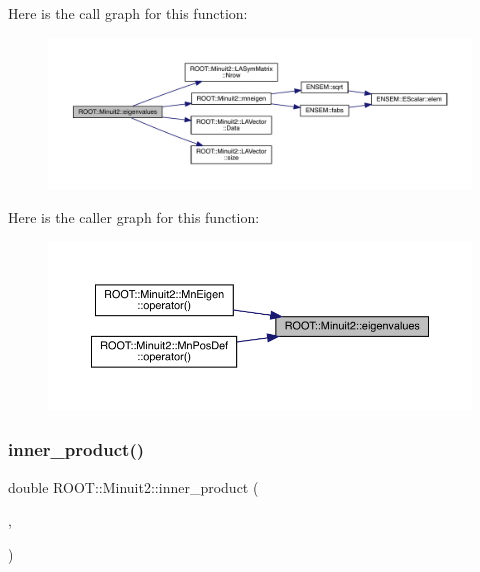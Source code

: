 Here is the call graph for this function\+:
\nopagebreak
\begin{figure}[H]
\begin{center}
\leavevmode
\includegraphics[width=350pt]{d6/d3a/namespaceROOT_1_1Minuit2_a1569bf99d4c46944433c0b5bb02b3ad6_cgraph}
\end{center}
\end{figure}
Here is the caller graph for this function\+:\nopagebreak
\begin{figure}[H]
\begin{center}
\leavevmode
\includegraphics[width=350pt]{d6/d3a/namespaceROOT_1_1Minuit2_a1569bf99d4c46944433c0b5bb02b3ad6_icgraph}
\end{center}
\end{figure}
\mbox{\label{namespaceROOT_1_1Minuit2_ac47f2faa5fce723ec08365b174b5035d}} 
\subsubsection{\texorpdfstring{inner\_product()}{inner\_product()}}
{\footnotesize\ttfamily double R\+O\+O\+T\+::\+Minuit2\+::inner\+\_\+product (\begin{DoxyParamCaption}\item[{const \mbox{\hyperlink{classROOT_1_1Minuit2_1_1LAVector}{L\+A\+Vector}} \&}]{,  }\item[{const \mbox{\hyperlink{classROOT_1_1Minuit2_1_1LAVector}{L\+A\+Vector}} \&}]{ }\end{DoxyParamCaption})}

